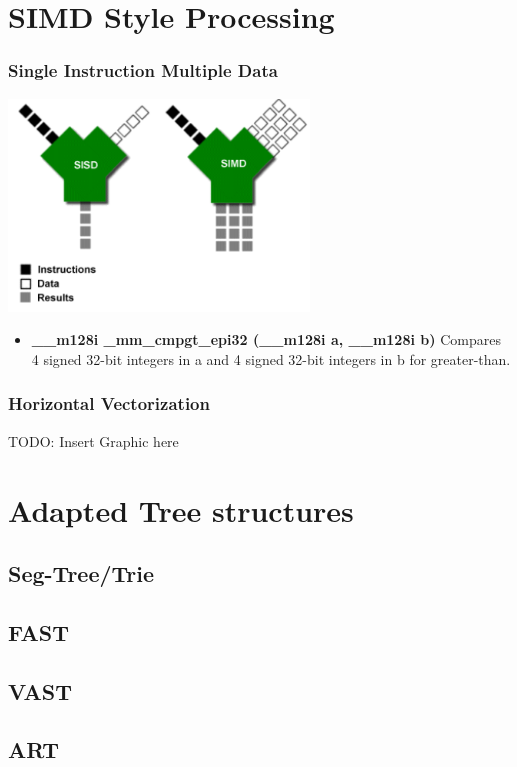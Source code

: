 \documentclass{beamer}
\begin{document}
\section{SIMD Style Processing}
\begin{frame}
\frametitle{Single Instruction Multiple Data}
\begin{center}
	\includegraphics[width=0.6\textwidth]{img/simd.png}
\end{center}
\begin{itemize}
	\item \textbf{\_\_m128i \_mm\_cmpgt\_epi32 (\_\_m128i a, \_\_m128i b)} Compares 4 signed 32-bit integers in a and 4 signed 32-bit integers
	in b for greater-than.
\end{itemize}
\end{frame}
\begin{frame}
\frametitle{Horizontal Vectorization}
\begin{center}
	TODO: Insert Graphic here
\end{center}
\end{frame}
\section{Adapted Tree structures}

\subsection{Seg-Tree/Trie}

\subsection{FAST}

\subsection{VAST}

\subsection{ART}
\end{document}
